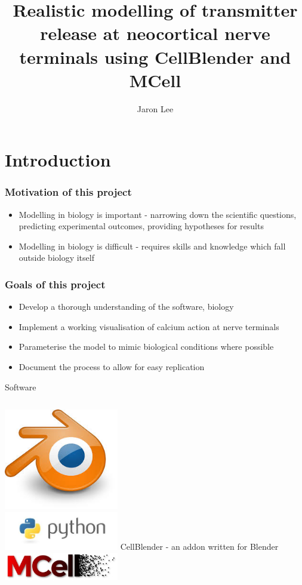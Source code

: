 \documentclass{beamer}
\begin{document}
\begin{frame}
\title{\textbf{Realistic modelling of transmitter release at neocortical nerve terminals using CellBlender and MCell}}
\author{Jaron Lee}
\maketitle
\end{frame}

\section{Introduction}
\frame
{
    \frametitle{Motivation of this project}
    \begin{itemize}
        \item Modelling in biology is important - narrowing down the scientific questions, predicting experimental outcomes, providing hypotheses for results
        \item Modelling in biology is difficult - requires skills and knowledge which fall outside biology itself
    \end{itemize}
}

\frame
{
    \frametitle{Goals of this project}
    \begin{itemize}
        \item<1->Develop a thorough understanding of the software, biology
        \item<2->Implement a working visualisation of calcium action at nerve terminals 
        \item<3->Parameterise the model to mimic biological conditions where possible 
        \item<4->Document the process to allow for easy replication 
    \end{itemize}
}

\begin{frame}{Software}
\begin{columns}[t]
\centering
\includegraphics[width=5cm]{blender.jpeg}\\
\includegraphics[width=5cm]{python.jpeg}
\centering
CellBlender - an addon written for Blender
\includegraphics[width=5cm]{mcell.jpeg}\\
\end{columns}
\end{frame}
\end{document}
